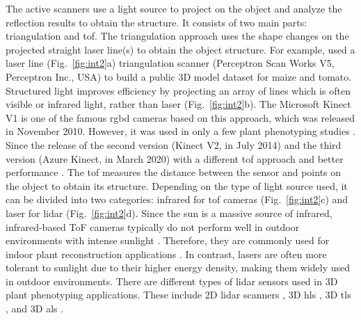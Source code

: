 The active scanners use a light source to project on the object and analyze the reflection results to obtain the structure. It consists of two main parts: triangulation and \gls{tof}. The triangulation approach uses the shape changes on the projected straight laser line(s) to obtain the object structure. For example, \citet[Figure~3]{schunck_pheno4d_2021} used a laser line (Fig.~\ref{fig:int2}a) triangulation scanner (Perceptron Scan Works V5, Perceptron Inc., USA) to build a public 3D model dataset for maize and tomato. Structured light improves efficiency by projecting an array of lines which is often visible or infrared light, rather than laser (Fig.~\ref{fig:int2}b). The Microsoft Kinect V1 is one of the famous \gls{rgbd} cameras based on this approach, which was released in November 2010. However, it was used in only a few plant phenotyping studies \citep{nguyen_structured_2015}. Since the release of the second version (Kinect V2, in July 2014) and the third version (Azure Kinect, in March 2020) with a different \gls{tof} approach and better performance \citep{tolgyessy_evaluation_2021, lachat_assessment_2015}. 
The \acrfull{tof} measures the distance between the sensor and points on the object to obtain its structure. Depending on the type of light source used, it can be divided into two categories: infrared for \gls{tof} cameras (Fig.~\ref{fig:int2}c) and laser for \gls{lidar} (Fig.~\ref{fig:int2}d). Since the sun is a massive source of infrared, infrared-based ToF cameras typically do not perform well in outdoor environments with intense sunlight \citep{tolgyessy_evaluation_2021}. Therefore, they are commonly used for indoor plant reconstruction applications \citep{martinez_low_2019, zhang_3d_2020, xu_global_2023}. In contrast, lasers are often more tolerant to sunlight due to their higher energy density, making them widely used in outdoor environments. There are different types of \gls{lidar} sensors used in 3D plant phenotyping applications. These include 2D \gls{lidar} scanners \citep{garrido_3d_2015}, 3D \gls{hls} \citep{ma_calculation_2019}, 3D \gls{tls} \citep{wu_accurate_2019, su_estimation_2018, qiu_field-based_2019}, and 3D \gls{als} \citep{ten_biomass_2019, nguyen_uav_2023}.

